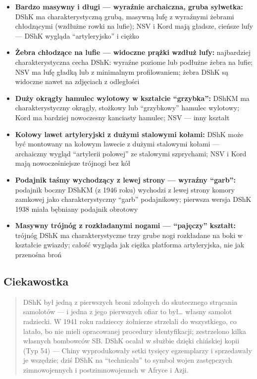 \documentclass[12pt,oneside]{book}
\providecommand{\tightlist}{%
  \setlength{\itemsep}{0pt}\setlength{\parskip}{0pt}}
\begin{document}
\begin{itemize}
\tightlist
\item
  \textbf{Bardzo masywny i długi --- wyraźnie archaiczna, gruba
  sylwetka:} DShK ma charakterystyczną grubą, masywną lufę z wyraźnymi
  żebrami chłodzącymi (wzdłużne rowki na lufie); NSV i Kord mają
  gładsze, cieńsze lufy --- DShK wygląda ``artyleryjsko'' i ciężko
\item
  \textbf{Żebra chłodzące na lufie --- widoczne prążki wzdłuż lufy:}
  najbardziej charakterystyczna cecha DShK: wyraźne poziome lub podłużne
  żebra na lufie; NSV ma lufę gładką lub z minimalnym profilowaniem;
  żebra DShK są widoczne nawet na zdjęciach z odległości
\item
  \textbf{Duży okrągły hamulec wylotowy w kształcie ``grzybka'':} DShKM
  ma charakterystyczny okrągły, stożkowy lub ``grzybkowy'' hamulec
  wylotowy; Kord ma bardziej nowoczesny kanciasty hamulec; NSV --- inny
  kształt
\item
  \textbf{Kołowy lawet artyleryjski z dużymi stalowymi kołami:} DShK
  może być montowany na kołowym lawecie z dużymi stalowymi kołami ---
  archaiczny wygląd ``artylerii polowej'' ze stalowymi szprychami; NSV i
  Kord mają nowocześ­niejsze trójnogi bez kół
\item
  \textbf{Podajnik taśmy wychodzący z lewej strony --- wyraźny
  ``garb'':} podajnik boczny DShKM (z 1946 roku) wychodzi z lewej strony
  komory zamkowej jako charakterystyczny ``garb'' podajnikowy; pierwsza
  wersja DShK 1938 miała bębniany podajnik obrotowy
\item
  \textbf{Masywny trójnóg z rozkładanymi nogami --- ``pajęczy''
  kształt:} trójnóg DShK ma charakterystyczne trzy grube nogi rozkładane
  na boki w kształcie gwiazdy; całość wygląda jak ciężka platforma
  artyleryjska, nie jak przenośna broń
\end{itemize}

\subsection{Ciekawostka}\label{ciekawostka-73}

\begin{quote}
DShK był jedną z pierwszych broni zdolnych do skutecznego strącania
samolotów --- i jedna z jego pierwszych ofiar to był\ldots{} własny
samolot radziecki. W 1941 roku radzieccy żołnierze strzelali do
wszystkiego, co latało, bo nie mieli opracowanej procedury
identyfikacji; zestrzelono kilka własnych bombowców SB. DShK ocalał w
służbie dzięki chińskiej kopii (Typ 54) --- Chiny wyprodukowały setki
tysięcy egzemplarzy i sprzedawały je wszędzie; dziś DShK na
``technicalu'' to symbol wojen zastępczych zimnowojennych i
postzimnowojennch w Afryce i Azji.
\end{quote}
\end{document}
